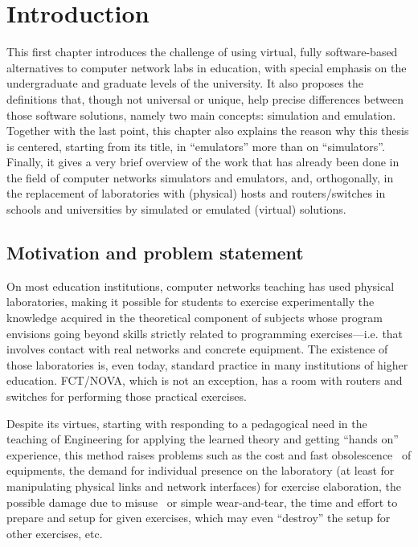 
\chapter{Introduction}
\label{ch:introduction}

This first chapter introduces the challenge of using virtual, fully software-based alternatives to computer network labs in education, with special emphasis on the undergraduate and graduate levels of the university. %
It also proposes the definitions that, though not universal or unique, help precise differences between those software solutions, namely two main concepts: simulation and emulation. %
Together with the last point, this chapter also explains the reason why this thesis is centered, starting from its title, in ``emulators'' more than on ``simulators''.
Finally, it gives a very brief overview of the work that has already been done in the field of computer networks simulators and emulators, and, orthogonally, in the replacement of laboratories with (physical) hosts and routers/switches in schools and universities by simulated or emulated (virtual) solutions.

\section{Motivation and problem statement}
\label{sec:motivation}

On most education institutions, computer networks teaching has used physical laboratories, making it possible for students to exercise experimentally the knowledge acquired in the theoretical component of subjects whose program envisions going beyond skills strictly related to programming exercises---i.e. that involves contact with real networks and concrete equipment.
The existence of those laboratories is, even today, standard practice in many institutions of higher education. FCT/NOVA, which is not an exception, has a room with routers and switches for performing those practical exercises.

Despite its virtues, starting with responding to a pedagogical need in the teaching of Engineering for applying the learned theory and getting ``hands on'' experience, this method raises problems such as the cost and fast obsolescence~\cite{automaticnetconfiggns} of equipments, the demand for individual presence on the laboratory (at least for manipulating physical links and network interfaces) for exercise elaboration, the possible damage due to misuse~\cite{teachinginovation} or simple wear-and-tear, the time and effort to prepare and setup for given exercises, which may even ``destroy'' the setup for other exercises, etc. %


